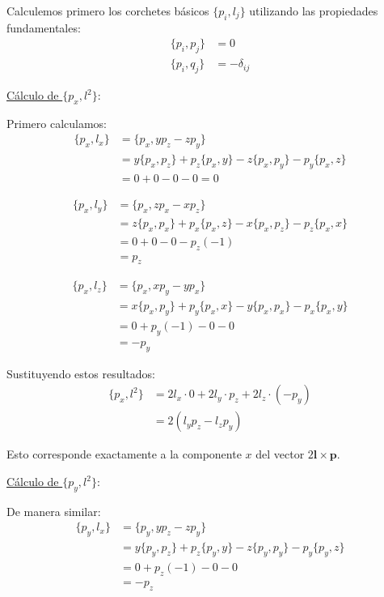 \documentclass[12pt]{article}
\begin{document}
\begin{enumerate}
  Calculemos primero los corchetes básicos $\{p_i, l_j\}$ utilizando las propiedades fundamentales:
  \begin{align}
  \{p_i, p_j\} &= 0\\
  \{p_i, q_j\} &= -\delta_{ij}
  \end{align}

  \underline{Cálculo de $\{p_x, l^2\}$}:

  Primero calculamos:
  \begin{align}
  \{p_x, l_x\} &= \{p_x, yp_z - zp_y\}\\
  &= y\{p_x,p_z\} + p_z\{p_x,y\} - z\{p_x,p_y\} - p_y\{p_x,z\}\\
  &= 0 + 0 - 0 - 0 = 0
  \end{align}

  \begin{align}
  \{p_x, l_y\} &= \{p_x, zp_x - xp_z\}\\
  &= z\{p_x,p_x\} + p_x\{p_x,z\} - x\{p_x,p_z\} - p_z\{p_x,x\}\\
  &= 0 + 0 - 0 - p_z(-1)\\
  &= p_z
  \end{align}

  \begin{align}
  \{p_x, l_z\} &= \{p_x, xp_y - yp_x\}\\
  &= x\{p_x,p_y\} + p_y\{p_x,x\} - y\{p_x,p_x\} - p_x\{p_x,y\}\\
  &= 0 + p_y(-1) - 0 - 0\\
  &= -p_y
  \end{align}

  Sustituyendo estos resultados:
  \begin{align}
  \{p_x, l^2\} &= 2l_x\cdot 0 + 2l_y \cdot p_z + 2l_z \cdot (-p_y)\\
  &= 2(l_yp_z - l_zp_y)
  \end{align}

  Esto corresponde exactamente a la componente $x$ del vector $2\mathbf{l}\times\mathbf{p}$.

  \underline{Cálculo de $\{p_y, l^2\}$}:

  De manera similar:
  \begin{align}
  \{p_y, l_x\} &= \{p_y, yp_z - zp_y\}\\
  &= y\{p_y,p_z\} + p_z\{p_y,y\} - z\{p_y,p_y\} - p_y\{p_y,z\}\\
  &= 0 + p_z(-1) - 0 - 0\\
  &= -p_z
  \end{align}


\end{enumerate}
\end{document}

